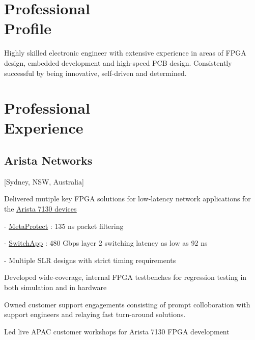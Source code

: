 \documentclass{mycv}
\begin{document}
\newcommand{\SubItem}[1]{
    {\setlength\itemindent{15pt} \item[-] #1}
}

\maketitle%

\section{Professional \\ Profile}

Highly skilled electronic engineer with extensive experience in areas of FPGA design, embedded development and high-speed PCB design. 
Consistently successful by being innovative, self-driven and determined.

\section{Professional \\ Experience}

\subsection{Arista Networks}[Sydney, NSW, Australia]
\begin{positions}
\end{positions}

\begin{itemize}[noitemsep]
  \item Delivered mutiple key FPGA solutions for low-latency network applications for the \href{https://www.arista.com/en/products/7130-network-applications-quick-look}{\underline{Arista 7130 devices}}
    \SubItem{\href{https://www.arista.com/assets/data/pdf/ProductBrief-MetaProtect-Firewall.pdf}{\underline{MetaProtect}} : 135 ns packet filtering}
    \SubItem{\href{https://www.arista.com/assets/data/pdf/ProductBrief-SwitchApp.pdf}{\underline{SwitchApp}} : 480 Gbps layer 2 switching latency as low as 92 ns}
    \SubItem{Multiple SLR designs with strict timing requirements}
  \item Developed wide-coverage, internal FPGA testbenches for regression testing in both simulation and in hardware
  \item Owned customer support engagements consisting of prompt colloboration with support engineers and relaying fast turn-around solutions.
  \item Led live APAC customer workshops for Arista 7130 FPGA development
\end{itemize}
\end{document}
